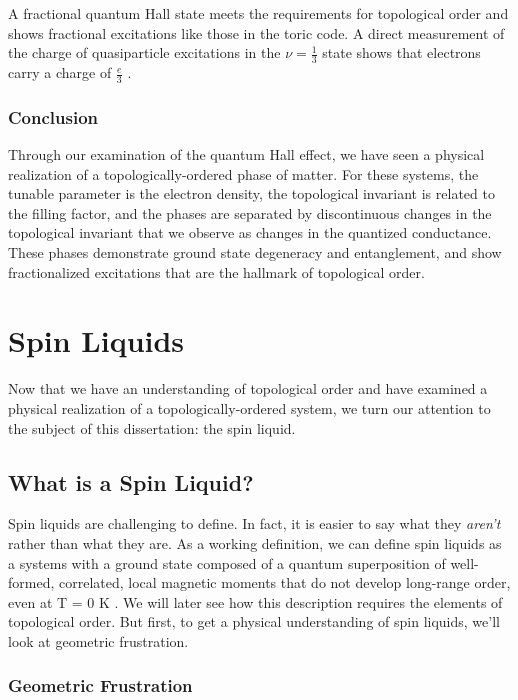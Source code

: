 A fractional quantum Hall state meets the requirements for topological order and shows fractional excitations like those in the toric code. A direct measurement of the charge of quasiparticle excitations in the $\nu=\frac{1}{3}$ state shows that electrons carry a charge of $\frac{e}{3}$ \cite{Goldman1995}.

\subsubsection{Conclusion}

Through our examination of the quantum Hall effect, we have seen a physical realization of a topologically-ordered phase of matter.  For these systems, the tunable parameter is the electron density, the topological invariant is related to the filling factor, and the phases are separated by discontinuous changes in the topological invariant that we observe as changes in the quantized conductance. These phases demonstrate ground state degeneracy and entanglement, and show fractionalized excitations that are the hallmark of topological order.

\section{Spin Liquids}

Now that we have an understanding of topological order and have examined a physical realization of a topologically-ordered system, we turn our attention to the subject of this dissertation: the spin liquid.

\subsection{What is a Spin Liquid?}

Spin liquids are challenging to define. In fact, it is easier to say what they \textit{aren't} rather than what they are. As a working definition, we can define spin liquids as a systems with a ground state composed of a quantum superposition of well-formed, correlated, local magnetic moments that do not develop long-range order, even at T = 0 K \cite{Balents2010}. We will later see how this description requires the elements of topological order. But first, to get a physical understanding of spin liquids, we'll look at geometric frustration.

\subsubsection{Geometric Frustration}

